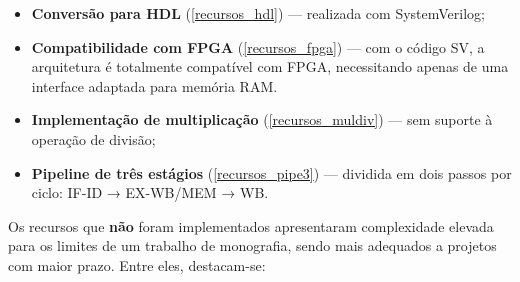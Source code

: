 \documentclass[
	12pt,				%
	openright,			%
	oneside,			%
	a4paper,			%
	english,			%
	french,				%
	spanish,			%
	brazil,				%
	]{abntex2}
\begin{document}
\begin{itemize}
    \item \textbf{Conversão para HDL} (\ref{recursos_hdl}) — realizada com SystemVerilog;

    \item \textbf{Compatibilidade com FPGA} (\ref{recursos_fpga}) — com o código SV, a arquitetura é totalmente compatível com FPGA, necessitando apenas de uma interface adaptada para memória RAM.

    \item \textbf{Implementação de multiplicação} (\ref{recursos_muldiv}) — sem suporte à operação de divisão;

    \item \textbf{Pipeline de três estágios} (\ref{recursos_pipe3}) — dividida em dois passos por ciclo: IF-ID → EX-WB/MEM → WB.
\end{itemize}

\vspace{1em}

Os recursos que \textbf{não} foram implementados apresentaram complexidade elevada para os limites de um trabalho de monografia, sendo mais adequados a projetos com maior prazo. Entre eles, destacam-se:
\end{document}
